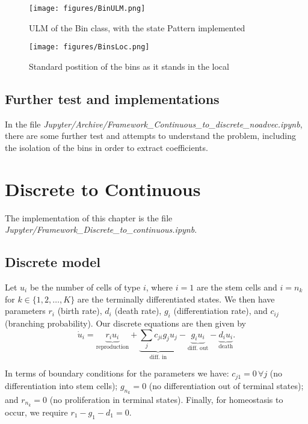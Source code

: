 \documentclass[11pt, oneside]{article}   	%
\begin{document}
\begin{figure}[h!]
\centering
\texttt{[image: figures/BinULM.png]}
\caption{ULM of the Bin class, with the state Pattern implemented}
\label{fig:ulmbin}
\end{figure}

\begin{figure}[h!]
\centering
\texttt{[image: figures/BinsLoc.png]}
\caption{Standard postition of the bins as it stands in the local }
\label{fig:binpos}
\end{figure}

\subsection{Further test and implementations}
In the file \textit{Jupyter/Archive/Framework\_Continuous\_to\_discrete\_noadvec.ipynb}, there are some further test and attempts to understand the problem, including the isolation of the bins in order to extract coefficients.

\section{Discrete to Continuous}
The implementation of this chapter is the file \textit{Jupyter/Framework\_Discrete\_to\_continuous.ipynb}.
\subsection{Discrete model}
Let $u_i$ be the number of cells of type $i$, where $i=1$ are the stem cells and $i=n_k$ for $k \in \{1,2,\dots,K\}$ are the terminally differentiated states.
We then have parameters $r_i$ (birth rate), $d_i$ (death rate), $g_i$ (differentiation rate), and $c_{ij}$ (branching probability).
Our discrete equations are then given by
\begin{equation}
\dot{u}_i =
\underbrace{r_i u_i}_{\text{reproduction}} +
\underbrace{\sum_j c_{ji} g_j u_j}_{\text{diff. in}} -
\underbrace{g_i u_i}_{\text{diff. out}} -
\underbrace{d_i u_i}_{\text{death}}.
\end{equation}

In terms of boundary conditions for the parameters we have: $c_{j1}=0 \, \forall j$ (no differentiation into stem cells); $g_{n_k}=0$ (no differentiation out of terminal states); and $r_{n_k}=0$ (no proliferation in terminal states).
Finally, for homeostasis to occur, we require $r_1 - g_1 - d_1 = 0$.
\end{document}
